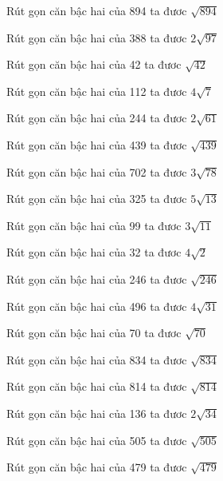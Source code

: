 \documentclass[12pt,a4paper]{article}
\begin{document}
\begin{ex}
Rút gọn căn bậc hai của 894 ta đươc $\sqrt{894}$
\end{ex}
\begin{ex}
Rút gọn căn bậc hai của 388 ta đươc $2\sqrt{97}$
\end{ex}
\begin{ex}
Rút gọn căn bậc hai của 42 ta đươc $\sqrt{42}$
\end{ex}
\begin{ex}
Rút gọn căn bậc hai của 112 ta đươc $4\sqrt{7}$
\end{ex}
\begin{ex}
Rút gọn căn bậc hai của 244 ta đươc $2\sqrt{61}$
\end{ex}
\begin{ex}
Rút gọn căn bậc hai của 439 ta đươc $\sqrt{439}$
\end{ex}
\begin{ex}
Rút gọn căn bậc hai của 702 ta đươc $3\sqrt{78}$
\end{ex}
\begin{ex}
Rút gọn căn bậc hai của 325 ta đươc $5\sqrt{13}$
\end{ex}
\begin{ex}
Rút gọn căn bậc hai của 99 ta đươc $3\sqrt{11}$
\end{ex}
\begin{ex}
Rút gọn căn bậc hai của 32 ta đươc $4\sqrt{2}$
\end{ex}
\begin{ex}
Rút gọn căn bậc hai của 246 ta đươc $\sqrt{246}$
\end{ex}
\begin{ex}
Rút gọn căn bậc hai của 496 ta đươc $4\sqrt{31}$
\end{ex}
\begin{ex}
Rút gọn căn bậc hai của 70 ta đươc $\sqrt{70}$
\end{ex}
\begin{ex}
Rút gọn căn bậc hai của 834 ta đươc $\sqrt{834}$
\end{ex}
\begin{ex}
Rút gọn căn bậc hai của 814 ta đươc $\sqrt{814}$
\end{ex}
\begin{ex}
Rút gọn căn bậc hai của 136 ta đươc $2\sqrt{34}$
\end{ex}
\begin{ex}
Rút gọn căn bậc hai của 505 ta đươc $\sqrt{505}$
\end{ex}
\begin{ex}
Rút gọn căn bậc hai của 479 ta đươc $\sqrt{479}$
\end{ex}
\end{document}
